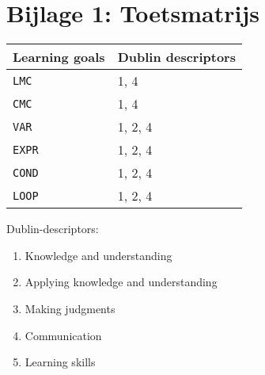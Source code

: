 \section*{Bijlage 1: Toetsmatrijs}
	\begin{tabular}{|p{1cm}|p{4cm}|}
		\hline
		Learning goals & Dublin descriptors \\
		\hline
		\texttt{LMC} & 1, 4 \\
		\hline
		\texttt{CMC} & 1, 4 \\
		\hline
		\texttt{VAR} & 1, 2, 4 \\
		\hline
		\texttt{EXPR} & 1, 2, 4 \\
		\hline
		\texttt{COND} & 1, 2, 4 \\
		\hline
		\texttt{LOOP} & 1, 2, 4 \\
		\hline
	\end{tabular}
	
	\vspace{1cm}

	Dublin-descriptors:
	\begin{enumerate}
		\item Knowledge and understanding
		\item Applying knowledge and understanding
		\item Making judgments
		\item Communication
		\item Learning skills
	\end{enumerate}
